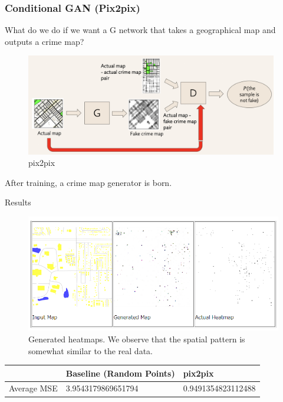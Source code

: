 \documentclass{beamer}
\begin{document}
\begin{frame}
    \frametitle{Conditional GAN (Pix2pix)}
    What do we do if we want a G network that takes a geographical map and outputs a crime map?
    \begin{figure}
        \centering
        \includegraphics[width=11cm]{Figures/conditionalgan.png}
        \caption{pix2pix}
        \label{pix2pix}
    \end{figure}

    After training, a crime map generator is born.
\end{frame}

\begin{frame}{Results} %

    \begin{figure}
        \includegraphics[width=0.8\linewidth]{Figures/Generated heats.png} %
        \caption{Generated heatmaps. We observe that the spatial pattern is somewhat similar to the real data.}
    \end{figure}

    \begin{table}[]
        \begin{tabular}{|l|l|l|}
            \hline
                        & Baseline (Random Points) & pix2pix            \\ \hline
            Average MSE & 3.9543179869651794       & 0.9491354823112488 \\ \hline
        \end{tabular}
    \end{table}
\end{frame}
\end{document}
